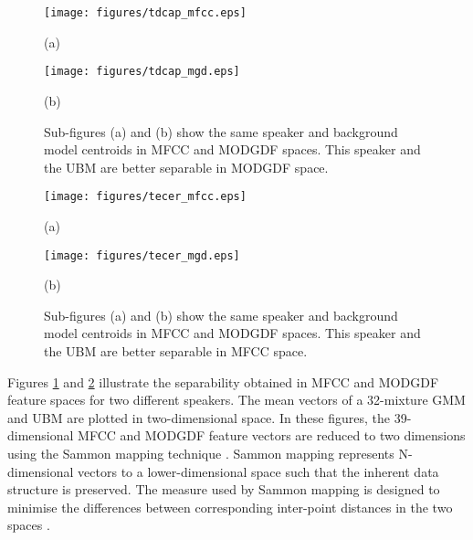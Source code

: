\documentclass{article}
\begin{document}
\begin{figure}[h]
\centering 
\begin{minipage}[c]{0.5\textwidth}
\centering 
    \texttt{[image: figures/tdcap\_mfcc.eps]}
	\caption*{(a)}
\end{minipage}%
\begin{minipage}[c]{0.35\textwidth}
\centering  
    \texttt{[image: figures/tdcap\_mgd.eps]}
	\caption*{(b)}
\end{minipage}
\caption{Sub-figures (a) and (b) show the same speaker and background model
centroids in MFCC and MODGDF spaces. This speaker and the UBM are better
separable in MODGDF space.}
\label{fig:ubm_sep1}
\end{figure}

\begin{figure}[h]
\centering 
\begin{minipage}[c]{0.45\textwidth}
\centering 
    \texttt{[image: figures/tecer\_mfcc.eps]}
	\caption*{(a)}
\end{minipage}%
\begin{minipage}[c]{0.45\textwidth}
\centering  
    \texttt{[image: figures/tecer\_mgd.eps]}
	\caption*{(b)}
\end{minipage}
\caption{Sub-figures (a) and (b) show the same speaker and background model
centroids in MFCC and MODGDF spaces. This speaker and the UBM are better
separable in MFCC space.}
\label{fig:ubm_sep2}
\end{figure}

Figures \ref{fig:ubm_sep1} and \ref{fig:ubm_sep2} illustrate the
separability obtained in MFCC and MODGDF feature spaces for two different
speakers. The mean vectors of a 32-mixture GMM and UBM are plotted in
two-dimensional space. In these figures, the 39-dimensional MFCC and MODGDF
feature vectors are reduced to two dimensions using the Sammon mapping technique
\cite{sammon}. Sammon mapping represents N-dimensional vectors to a 
lower-dimensional space such that the inherent data structure is preserved. The measure
used by Sammon mapping is designed to minimise the differences between corresponding
inter-point distances in the two spaces \cite{sammon1}. 
\end{document}
